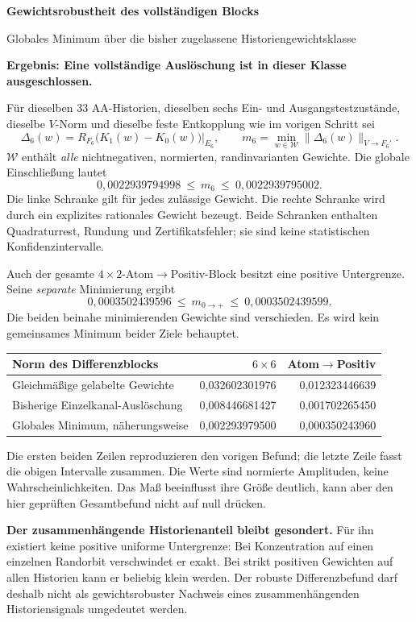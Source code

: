 \documentclass[10pt,a4paper]{article}
\newcommand{\W}{\mathcal W}\newcommand{\dd}{\mathrm d}
\begin{document}
{\color{ink}\LARGE\bfseries Gewichtsrobustheit des vollständigen Blocks}\par
{\large Globales Minimum über die bisher zugelassene Historiengewichtsklasse}\par
\textbf{Ergebnis: Eine vollständige Auslöschung ist in dieser Klasse ausgeschlossen.}

Für dieselben 33 AA-Historien, dieselben sechs Ein- und Ausgangstestzustände,
dieselbe $V$-Norm und dieselbe feste Entkopplung wie im vorigen Schritt sei
\[
 \Delta_6(w)=R_{F_6}\bigl(K_1(w)-K_0(w)\bigr)|_{E_6},\qquad
 m_6=\min_{w\in\W}\|\Delta_6(w)\|_{V\to F_6'}.
\]
$\W$ enthält \emph{alle} nichtnegativen, normierten, randinvarianten Gewichte.
Die globale Einschließung lautet
\[
 \boxed{0{,}0022939794998\ \leq\ m_6\ \leq\ 0{,}0022939795002.}
\]
Die linke Schranke gilt für jedes zulässige Gewicht. Die rechte Schranke
wird durch ein explizites rationales Gewicht bezeugt. Beide Schranken
enthalten Quadraturrest, Rundung und Zertifikatsfehler; sie sind keine
statistischen Konfidenzintervalle.

Auch der gesamte $4\times2$-Atom$\to$Positiv-Block besitzt eine positive
Untergrenze. Seine \emph{separate} Minimierung ergibt
\[
 \boxed{0{,}0003502439596\ \leq\ m_{0\to+}\ \leq\ 0{,}0003502439599.}
\]
Die beiden beinahe minimierenden Gewichte sind verschieden. Es wird kein
gemeinsames Minimum beider Ziele behauptet.

\begin{center}\begin{tabular}{lrr}\toprule
Norm des Differenzblocks & $6\times6$ & Atom$\to$Positiv\\\midrule
Gleichmäßige gelabelte Gewichte & 0,032602301976 & 0,012323446639\\
Bisherige Einzelkanal-Auslöschung & 0,008446681427 & 0,001702265450\\
Globales Minimum, näherungsweise & 0,002293979500 & 0,000350243960\\\bottomrule
\end{tabular}\end{center}
Die ersten beiden Zeilen reproduzieren den vorigen Befund; die letzte
Zeile fasst die obigen Intervalle zusammen. Die Werte sind normierte
Amplituden, keine Wahrscheinlichkeiten. Das Maß beeinflusst ihre Größe
deutlich, kann aber den hier geprüften Gesamtbefund nicht auf null drücken.

\textbf{Der zusammenhängende Historienanteil bleibt gesondert.}
Für ihn existiert keine positive uniforme Untergrenze: Bei Konzentration
auf einen einzelnen Randorbit verschwindet er exakt. Bei strikt positiven
Gewichten auf allen Historien kann er beliebig klein werden. Der robuste
Differenzbefund darf deshalb nicht als gewichtsrobuster Nachweis eines
zusammenhängenden Historiensignals umgedeutet werden.
\end{document}
